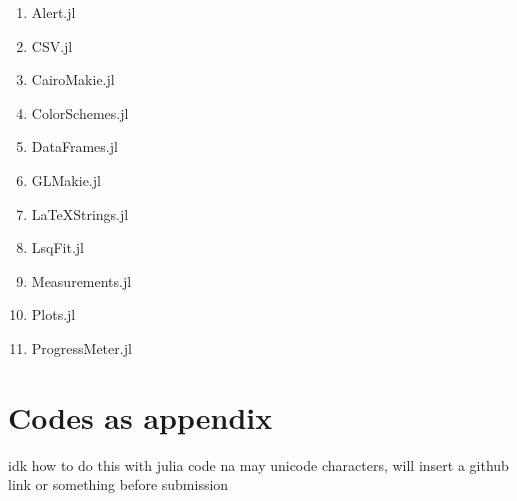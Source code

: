 \begin{enumerate}
    \item Alert.jl %
    \item CSV.jl %
    \item CairoMakie.jl \cite{MakieJL}
    \item ColorSchemes.jl %
    \item DataFrames.jl \cite{DataFramesJL}
    \item GLMakie.jl \cite{MakieJL}
    \item LaTeXStrings.jl %
    \item LsqFit.jl %
    \item Measurements.jl \cite{Measurements.jl-2016}
    \item Plots.jl \cite{PlotsJL}
    \item ProgressMeter.jl %
\end{enumerate}

\section{Codes as appendix}

idk how to do this with julia code na may unicode characters, will insert a github link or something before submission






%  

